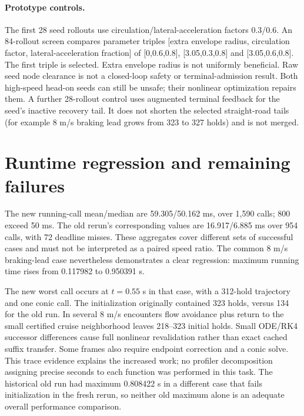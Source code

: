 \documentclass[11pt]{article}
\begin{document}
\paragraph{Prototype controls.}
The first 28 seed rollouts use circulation/lateral-acceleration factors
0.3/0.6. An 84-rollout screen compares parameter triples
[extra envelope radius, circulation factor, lateral-acceleration fraction]
of [0,0.6,0.8], [3.05,0.3,0.8] and [3.05,0.6,0.8]. The first triple is selected.
Extra envelope radius is not uniformly beneficial. Raw seed node clearance
is not a closed-loop safety or terminal-admission result. Both high-speed
head-on seeds can still be unsafe; their nonlinear optimization repairs them.
A further 28-rollout control uses augmented terminal feedback for the seed's
inactive recovery tail. It does not shorten the selected straight-road tails
(for example 8 m/s braking lead grows from 323 to 327 holds) and is not merged.

\section{Runtime regression and remaining failures}
The new running-call mean/median are 59.305/50.162 ms, over 1,590 calls; 800
exceed 50 ms. The old rerun's corresponding values are 16.917/6.885 ms over
954 calls, with 72 deadline misses. These aggregates cover different sets
of successful cases and must not be interpreted as a paired speed ratio.
The common 8 m/s braking-lead case nevertheless demonstrates a clear
regression: maximum running time rises from 0.117982 to 0.950391 s.

The new worst call occurs at $t=0.55$ s in that case, with a 312-hold trajectory
and one conic call. The initialization originally contained 323 holds, versus
134 for the old run. In several 8 m/s encounters flow avoidance plus return
to the small certified cruise neighborhood leaves 218--323 initial holds.
Small ODE/RK4 successor differences cause full nonlinear revalidation rather
than exact cached suffix transfer. Some frames also require endpoint
correction and a conic solve. This trace evidence explains the increased
work; no profiler decomposition assigning precise seconds to each function
was performed in this task. The historical old run had maximum 0.808422 s
in a different case that fails initialization in the fresh rerun, so neither
old maximum alone is an adequate overall performance comparison.
\end{document}
